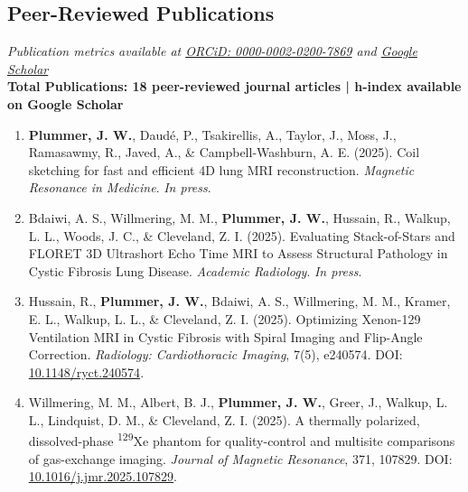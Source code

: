 \documentclass[11pt,]{scrartcl}
\begin{document}
\subsection{Peer-Reviewed Publications} %

\noindent\textit{Publication metrics available at \href{https://orcid.org/0000-0002-0200-7869}{ORCiD: 0000-0002-0200-7869} and \href{https://scholar.google.com/citations?user=P4umM3AAAAAJ&hl=en}{Google Scholar}}\\[0.2cm]

\textbf{Total Publications: 18 peer-reviewed journal articles | h-index available on Google Scholar}

\begin{enumerate}
  \leftskip-0.13in

    \item \textbf{Plummer, J. W.}, Daudé, P., Tsakirellis, A., Taylor, J., Moss, J., Ramasawmy, R., Javed, A., \& Campbell-Washburn, A. E. (2025). Coil sketching for fast and efficient 4D lung MRI reconstruction. \textit{Magnetic Resonance in Medicine}. \textit{In press}.

    \item Bdaiwi, A. S., Willmering, M. M., \textbf{Plummer, J. W.}, Hussain, R., Walkup, L. L., Woods, J. C., \& Cleveland, Z. I. (2025). Evaluating Stack-of-Stars and FLORET 3D Ultrashort Echo Time MRI to Assess Structural Pathology in Cystic Fibrosis Lung Disease. \textit{Academic Radiology}. \textit{In press}.

    \item Hussain, R., \textbf{Plummer, J. W.}, Bdaiwi, A. S., Willmering, M. M., Kramer, E. L., Walkup, L. L., \& Cleveland, Z. I. (2025). Optimizing Xenon-129 Ventilation MRI in Cystic Fibrosis with Spiral Imaging and Flip-Angle Correction. \textit{Radiology: Cardiothoracic Imaging}, 7(5), e240574. DOI: \href{https://doi.org/10.1148/ryct.240574}{10.1148/ryct.240574}.

    \item Willmering, M. M., Albert, B. J., \textbf{Plummer, J. W.}, Greer, J., Walkup, L. L., Lindquist, D. M., \& Cleveland, Z. I. (2025). A thermally polarized, dissolved-phase \textsuperscript{129}Xe phantom for quality-control and multisite comparisons of gas-exchange imaging. \textit{Journal of Magnetic Resonance}, 371, 107829. DOI: \href{https://doi.org/10.1016/j.jmr.2025.107829}{10.1016/j.jmr.2025.107829}.


\end{enumerate}
\end{document}
